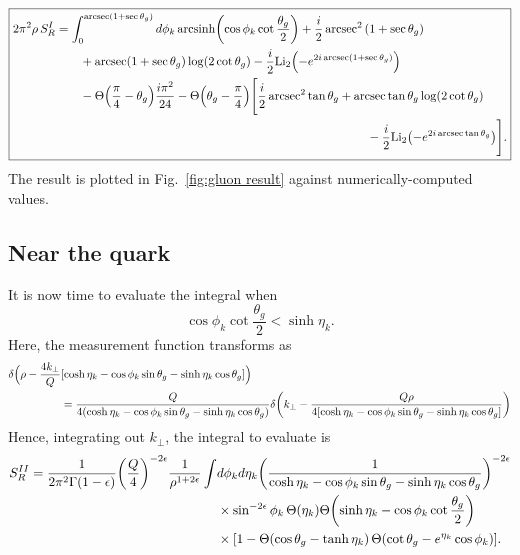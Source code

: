 \documentclass[11pt,twoside,reqno]{amsart}
\theoremstyle{plain}
\theoremstyle{remark}
\theoremstyle{definition}
\theoremstyle{remark}
\theoremstyle{definition}
\theoremstyle{definition}
\newcommand{\Li}{\mathrm{Li}}
\newcommand{\arcsinh}{\mathrm{arcsinh}}
\begin{document}
	\begin{equation}\label{eq:gluon result}
	\boxed{
	\begin{aligned}
		2\pi^2\rho \, S_R^I &= \int_0^{\arcsec(1+\sec\theta_g)} d\phi_k \,\arcsinh\qty(\cos\phi_k\cot\frac{\theta_g}{2}) + \frac{i}{2}\arcsec^2\qty(1 + \sec\theta_g) \\
		&\qquad + \arcsec(1 + \sec\theta_g)\log(2\cot\theta_g) - \frac{i}{2}\Li_2\qty(-e^{2i\arcsec(1+\sec\theta_g)}) \\
		&\qquad - \Theta\qty(\frac{\pi}{4} - \theta_g)\frac{i\pi^2}{24} - \Theta\qty(\theta_g - \frac{\pi}{4})\Bigg[ \frac{i}{2}\arcsec^2\tan\theta_g + \arcsec\tan\theta_g \log(2\cot\theta_g) \\
		&\hspace{9cm}- \frac{i}{2}\Li_2\qty(-e^{2i\arcsec\tan\theta_g}) \Bigg].
	\end{aligned}
	}
	\end{equation}
	The result is plotted in Fig.~\ref{fig:gluon result} against numerically-computed values.


\subsection{Near the quark}
	It is now time to evaluate the integral when
	\begin{equation}
		\cos\phi_k \cot\frac{\theta_g}{2} < \sinh\eta_k.
	\end{equation}
	Here, the measurement function transforms as
	\begin{equation}
	\begin{aligned}
		\delta\Big(\rho - \frac{4 k_\perp}{Q}&\qty[\cosh\eta_k - \cos\phi_k\sin\theta_g - \sinh\eta_k\cos\theta_g]\Big) \\
		&= \frac{Q}{4\qty(\cosh\eta_k - \cos\phi_k\sin\theta_g - \sinh\eta_k\cos\theta_g)} \delta\qty(k_\perp - \frac{Q \rho}{4\qty[\cosh\eta_k - \cos\phi_k\sin\theta_g - \sinh\eta_k\cos\theta_g]})
	\end{aligned}
	\end{equation}
	Hence, integrating out $k_\perp$, the integral to evaluate is
	\begin{equation}
	\begin{aligned}
		S_R^{II} = \frac{1}{2\pi^2\Gamma(1-\epsilon)} \qty(\frac{Q}{4})^{-2\epsilon} \frac{1}{\rho^{1+2\epsilon}} \int &d\phi_k d\eta_k \qty(\frac{1}{\cosh\eta_k - \cos\phi_k\sin\theta_g - \sinh\eta_k\cos\theta_g})^{-2\epsilon} \\
			&\times \sin^{-2\epsilon}\phi_k \,\Theta(\eta_k)\Theta\qty(\sinh\eta_k - \cos\phi_k\cot\frac{\theta_g}{2}) \\
			&\times \qty[1 - \Theta(\cos\theta_g - \tanh\eta_k)\,\Theta\qty(\cot\theta_g - e^{\eta_k}\cos\phi_k)].
	\end{aligned}
	\end{equation}
	




\end{document}

